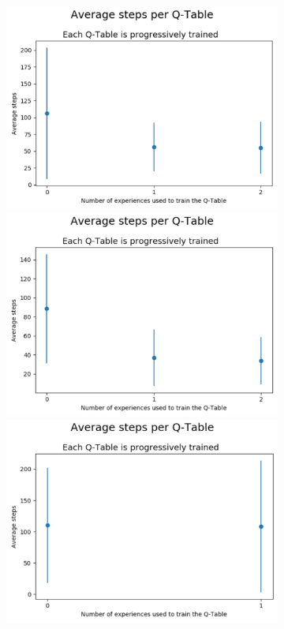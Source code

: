 \documentclass[journal]{IEEEtran}
\begin{document}
{{\begin{figure}[h!]
\begin{subfigure}{0.5\textwidth}
\includegraphics[scale=0.2]{Images/Average_steps/jose.png}
 \includegraphics[scale=0.2]{Images/Average_steps/juan.png} 
  \includegraphics[scale=0.2]{Images/Average_steps/manu.png} 

\end{subfigure}
\end{figure}}}
\end{document}
